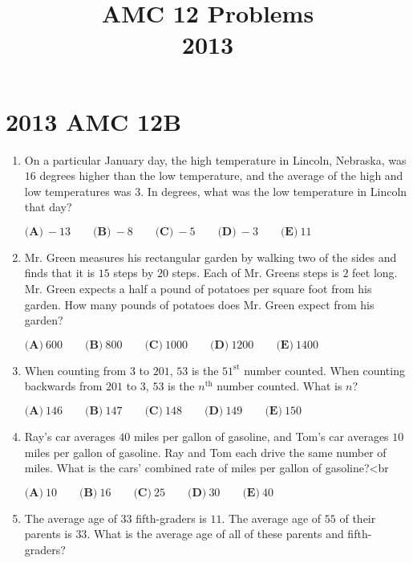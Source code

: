 \documentclass{article}
\title{AMC 12 Problems \\ 2013}
\date{}
\begin{document}
\maketitle\thispagestyle{fancy}\newpage\section*{2013 AMC 12B}\begin{enumerate}[label=\arabic*., itemsep=0.5em]\item On a particular January day, the high temperature in Lincoln, Nebraska, was \(16\) degrees higher than the low temperature, and the average of the high and low temperatures was \(3\). In degrees, what was the low temperature in Lincoln that day?

\(\textbf{(A)}\ -13 \qquad \textbf{(B)}\ -8 \qquad \textbf{(C)}\ -5 \qquad \textbf{(D)}\ -3 \qquad \textbf{(E)}\ 11\)\par \vspace{0.5em}\item Mr. Green measures his rectangular garden by walking two of the sides and finds that it is \(15\) steps by \(20\) steps. Each of Mr. Greens steps is \(2\) feet long. Mr. Green expects a half a pound of potatoes per square foot from his garden. How many pounds of potatoes does Mr. Green expect from his garden?

\(\textbf{(A)}\ 600 \qquad \textbf{(B)}\ 800 \qquad \textbf{(C)}\ 1000 \qquad \textbf{(D)}\ 1200 \qquad \textbf{(E)}\ 1400\)\par \vspace{0.5em}\item When counting from \(3\) to \(201\), \(53\) is the \(51^{\text{st}}\) number counted. When counting backwards from \(201\) to \(3\), \(53\) is the \(n^{\text{th}}\) number counted. What is \(n\)?

\(\textbf{(A)}\ 146 \qquad \textbf{(B)}\ 147 \qquad \textbf{(C)}\ 148 \qquad \textbf{(D)}\ 149 \qquad \textbf{(E)}\ 150\)\par \vspace{0.5em}\item Ray's car averages \(40\) miles per gallon of gasoline, and Tom's car averages \(10\) miles per gallon of gasoline. Ray and Tom each drive the same number of miles. What is the cars' combined rate of miles per gallon of gasoline?<br \>

\(\textbf{(A)}\ 10 \qquad \textbf{(B)}\ 16 \qquad \textbf{(C)}\ 25 \qquad \textbf{(D)}\ 30 \qquad \textbf{(E)}\ 40\)\par \vspace{0.5em}\item The average age of \(33\) fifth-graders is \(11\). The average age of \(55\) of their parents is \(33\). What is the average age of all of these parents and fifth-graders?


\end{enumerate}
\end{document}
